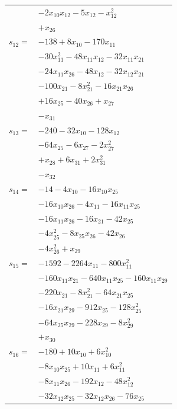 \begin{longtable}{@{}r@{\;}l@{}}
 & \(\displaystyle -2x_{10}x_{12} -5x_{12} -x_{12}^{2}\) \\
 & \(\displaystyle +x_{26}\) \\[3pt]
\(s_{12}=\) & \(\displaystyle -138 +8x_{10} -170x_{11}\) \\
 & \(\displaystyle -30x_{11}^{2} -48x_{11}x_{12} -32x_{11}x_{21}\) \\
 & \(\displaystyle -24x_{11}x_{26} -48x_{12} -32x_{12}x_{21}\) \\
 & \(\displaystyle -100x_{21} -8x_{21}^{2} -16x_{21}x_{26}\) \\
 & \(\displaystyle +16x_{25} -40x_{26} +x_{27}\) \\
 & \(\displaystyle -x_{31}\) \\[3pt]
\(s_{13}=\) & \(\displaystyle -240 -32x_{10} -128x_{12}\) \\
 & \(\displaystyle -64x_{25} -6x_{27} -2x_{27}^{2}\) \\
 & \(\displaystyle +x_{28} +6x_{31} +2x_{31}^{2}\) \\
 & \(\displaystyle -x_{32}\) \\[3pt]
\(s_{14}=\) & \(\displaystyle -14 -4x_{10} -16x_{10}x_{25}\) \\
 & \(\displaystyle -16x_{10}x_{26} -4x_{11} -16x_{11}x_{25}\) \\
 & \(\displaystyle -16x_{11}x_{26} -16x_{21} -42x_{25}\) \\
 & \(\displaystyle -4x_{25}^{2} -8x_{25}x_{26} -42x_{26}\) \\
 & \(\displaystyle -4x_{26}^{2} +x_{29}\) \\[3pt]
\(s_{15}=\) & \(\displaystyle -1592 -2264x_{11} -800x_{11}^{2}\) \\
 & \(\displaystyle -160x_{11}x_{21} -640x_{11}x_{25} -160x_{11}x_{29}\) \\
 & \(\displaystyle -220x_{21} -8x_{21}^{2} -64x_{21}x_{25}\) \\
 & \(\displaystyle -16x_{21}x_{29} -912x_{25} -128x_{25}^{2}\) \\
 & \(\displaystyle -64x_{25}x_{29} -228x_{29} -8x_{29}^{2}\) \\
 & \(\displaystyle +x_{30}\) \\[3pt]
\(s_{16}=\) & \(\displaystyle -180 +10x_{10} +6x_{10}^{2}\) \\
 & \(\displaystyle -8x_{10}x_{25} +10x_{11} +6x_{11}^{2}\) \\
 & \(\displaystyle -8x_{11}x_{26} -192x_{12} -48x_{12}^{2}\) \\
 & \(\displaystyle -32x_{12}x_{25} -32x_{12}x_{26} -76x_{25}\) \\

\end{longtable}
